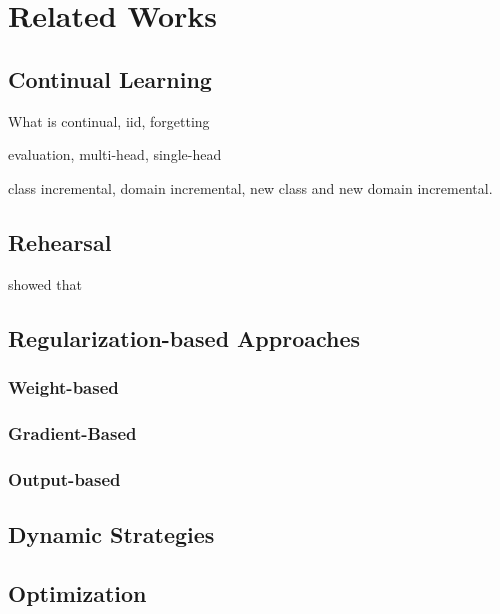\chapter{Related Works}
\label{chapter:related}

{}


\section{Continual Learning}

What is continual, iid, forgetting

evaluation, multi-head, single-head

class incremental, domain incremental, new class and new domain incremental. \cite{lomonaco2017core50}

\section{Rehearsal}

\citep{lesort2019regulshortcomings} showed that

\section{Regularization-based Approaches}

\subsection{Weight-based}

\subsection{Gradient-Based}

\subsection{Output-based}

\section{Dynamic Strategies}



\section{Optimization}

